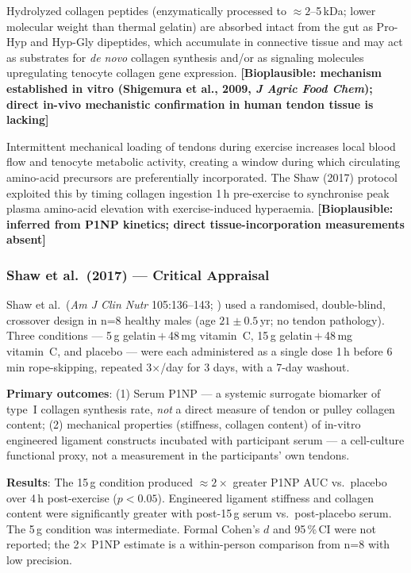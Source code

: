 Hydrolyzed collagen peptides (enzymatically processed to ${\approx}2$--5\,kDa; lower molecular weight than thermal gelatin) are absorbed intact from the gut as Pro-Hyp and Hyp-Gly dipeptides, which accumulate in connective tissue and may act as substrates for \textit{de novo} collagen synthesis and/or as signaling molecules upregulating tenocyte collagen gene expression. \textbf{[Bioplausible: mechanism established in vitro (Shigemura et al., 2009, \textit{J Agric Food Chem}); direct in-vivo mechanistic confirmation in human tendon tissue is lacking]}

Intermittent mechanical loading of tendons during exercise increases local blood flow and tenocyte metabolic activity, creating a window during which circulating amino-acid precursors are preferentially incorporated. The Shaw (2017) protocol exploited this by timing collagen ingestion 1\,h pre-exercise to synchronise peak plasma amino-acid elevation with exercise-induced hyperaemia. \textbf{[Bioplausible: inferred from P1NP kinetics; direct tissue-incorporation measurements absent]}

\subsubsection{Shaw et al.\ (2017) --- Critical Appraisal}

Shaw et al.\ (\textit{Am J Clin Nutr} 105:136--143; \cite{SLBR+17}) used a randomised, double-blind, crossover design in n=8 healthy males (age $21{\pm}0.5$\,yr; no tendon pathology). Three conditions --- 5\,g gelatin\,$+$\,48\,mg vitamin~C, 15\,g gelatin\,$+$\,48\,mg vitamin~C, and placebo --- were each administered as a single dose 1\,h before 6\,min rope-skipping, repeated 3$\times$/day for 3 days, with a 7-day washout.

\textbf{Primary outcomes}: (1) Serum P1NP --- a systemic surrogate biomarker of type~I collagen synthesis rate, \textit{not} a direct measure of tendon or pulley collagen content; (2) mechanical properties (stiffness, collagen content) of in-vitro engineered ligament constructs incubated with participant serum --- a cell-culture functional proxy, not a measurement in the participants' own tendons.

\textbf{Results}: The 15\,g condition produced ${\approx}2{\times}$ greater P1NP AUC vs.\ placebo over 4\,h post-exercise ($p{<}0.05$). Engineered ligament stiffness and collagen content were significantly greater with post-15\,g serum vs.\ post-placebo serum. The 5\,g condition was intermediate. Formal Cohen's $d$ and 95\,\%\,CI were not reported; the 2$\times$ P1NP estimate is a within-person comparison from n=8 with low precision.

